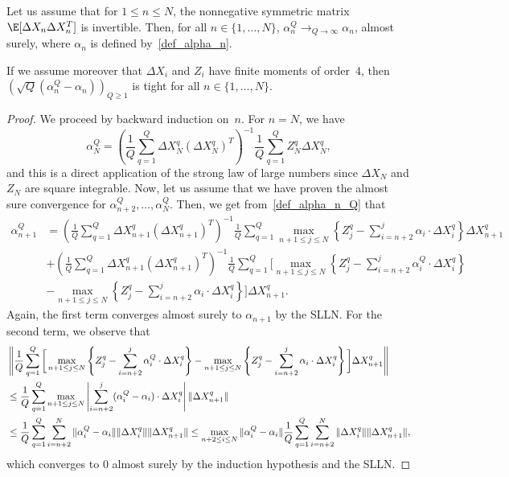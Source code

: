 \begin{proposition}\label{prop:cv_alpha} Let us assume that for $1\le n\le N$, the nonnegative symmetric matrix $\E[\Delta X_{n} \Delta X_{n}^T]$ is invertible. Then, for all $n \in \{1,\dots, N\}$, $\alpha^Q_n\to_{Q\to \infty} \alpha_n$, almost surely, where $\alpha_n$ is defined by~\eqref{def_alpha_n}.

 If we assume moreover that $\Delta X_i$ and $Z_{i}$ have finite moments of order~$4$, then $\left(\sqrt{Q}(\alpha_n^Q- \alpha_n)\right)_{Q \ge 1}$ is tight for all $n \in \{1,\dots, N\}$.   
\end{proposition}
\begin{proof}
We proceed by backward induction on~$n$. For $n=N$, we have 
$$\alpha_N^Q=  \left( \frac 1 Q \sum_{q=1}^Q \Delta X^q_{N} (\Delta X^q_{N})^T \right)^{-1} \frac 1 Q \sum_{q=1}^Q Z^q_{N} \Delta X^q_{N},$$
and this is a direct application of the strong law of large numbers since $\Delta X_N$ and $Z_{N}$ are square integrable. Now, let us assume that we have proven the almost sure convergence for $\alpha^Q_{n+2},\dots, \alpha^Q_N$. Then, we get from~\eqref{def_alpha_n_Q} that
\begin{align*}
  \alpha_{n+1}^Q&=\left( \frac 1 Q \sum_{q=1}^Q \Delta X^q_{n+1} (\Delta X^q_{n+1})^T \right)^{-1} \frac 1 Q \sum_{q=1}^Q \max_{n + 1\le j \le N} \left\{ Z^q_{j} - \sum_{i=n+2}^{j} \alpha_i \cdot \Delta X^q_i \right\} \Delta X^q_{n+1}\\
  &+\left( \frac 1 Q \sum_{q=1}^Q \Delta X^q_{n+1} (\Delta X^q_{n+1})^T \right)^{-1} \frac 1 Q \sum_{q=1}^Q \bigg[ \max_{n + 1\le j \le N} \left\{ Z^q_{j} - \sum_{i=n+2}^{j} \alpha^Q_i \cdot \Delta X^q_i \right\} \\
  & -\max_{n + 1\le j \le N} \left\{ Z^q_{j} - \sum_{i=n+2}^{j} \alpha_i \cdot \Delta X^q_i \right\} \bigg]\Delta X^q_{n+1}.
\end{align*}
Again, the first term converges almost surely to $\alpha_{n+1}$ by the SLLN. For the second term, we observe that
\begin{align}
&  \left\| \frac 1 Q \sum_{q=1}^Q \bigg[ \max_{n + 1\le j \le N} \left\{ Z^q_{j} - \sum_{i=n+2}^{j} \alpha^Q_i \cdot \Delta X^q_i \right\} 
 -\max_{n + 1\le j \le N} \left\{ Z^q_{j} - \sum_{i=n+2}^{j} \alpha_i \cdot \Delta X^q_i \right\} \bigg]\Delta X^q_{n+1}\right\| \notag \\
 &\le \frac 1 Q \sum_{q=1}^Q \max_{n + 1\le j \le N} \left|\sum_{i=n+2}^{j} (\alpha^Q_i-\alpha_i) \cdot \Delta X^q_i \right| \|\Delta X^q_{n+1}\|  \label{bound_norm_max}\\
 &\le  \frac 1 Q \sum_{q=1}^Q  \sum_{i=n+2}^{N} \|\alpha^Q_i-\alpha_i \| \| \Delta X^q_i\| \|\Delta X^q_{n+1}\| \le \max_{n+2\le i \le N} \|\alpha^Q_i-\alpha_i \| \frac 1 Q \sum_{q=1}^Q  \sum_{i=n+2}^{N} \| \Delta X^q_i\| \| \Delta X^q_{n+1} \|,\notag 
\end{align}
which converges to $0$ almost surely by the induction hypothesis and the SLLN. 



\end{proof}
